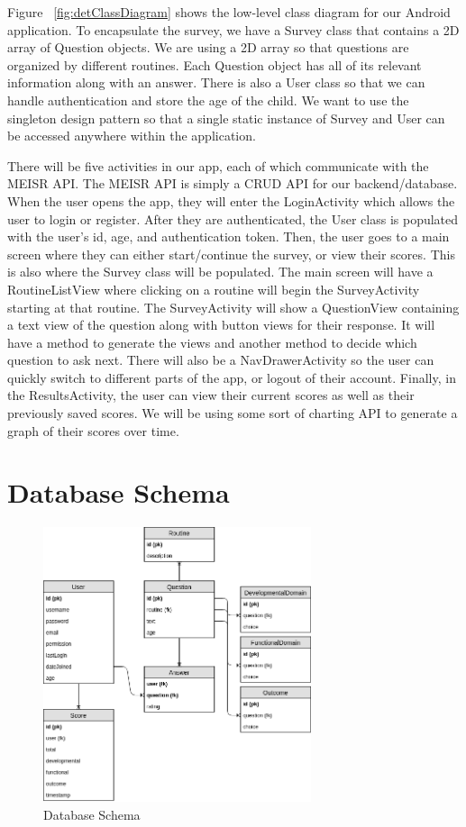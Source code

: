 Figure ~\ref{fig:detClassDiagram} shows the low-level class diagram for our Android application. To encapsulate the survey, we have a Survey class that contains a 2D array of Question objects. We are using a 2D array so that questions are organized by different routines. Each Question object has all of its relevant information along with an answer. There is also a User class so that we can handle authentication and store the age of the child. We want to use the singleton design pattern so that a single static instance of Survey and User can be accessed anywhere within the application. 

There will be five activities in our app, each of which communicate with the MEISR API. The MEISR API is simply a CRUD API for our backend/database. When the user opens the app, they will enter the LoginActivity which allows the user to login or register. After they are authenticated, the User class is populated with the user's id, age, and authentication token. Then, the user goes to a main screen where they can either start/continue the survey, or view their scores. This is also where the Survey class will be populated. The main screen will have a RoutineListView where clicking on a routine will begin the SurveyActivity starting at that routine. The SurveyActivity will show a QuestionView containing a text view of the question along with button views for their response. It will have a method to generate the views and another method to decide which question to ask next. There will also be a NavDrawerActivity so the user can quickly switch to different parts of the app, or logout of their account. Finally, in the ResultsActivity, the user can view their current scores as well as their previously saved scores. We will be using some sort of charting API to generate a graph of their scores over time.

\section{Database Schema}

\begin{figure}[H]
  \centering
  \includegraphics[width=0.7\textwidth]{images/db_schema.png}
  \caption{Database Schema}
  \label{fig:dbSchema}
\end{figure}

